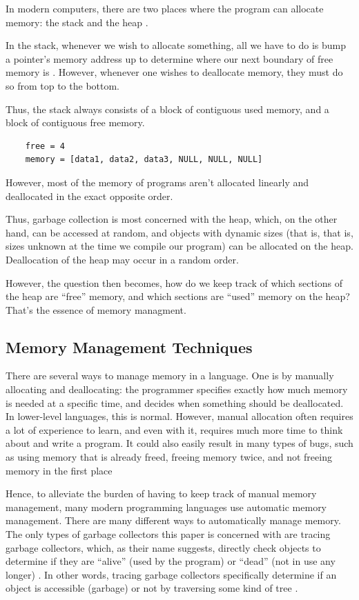 \documentclass[index]{subfiles}
\begin{document}
In modern computers, there are two places where the program can allocate memory: the stack and the heap .

In the stack, whenever we wish to allocate something, all we have to do is bump a pointer's memory address up to determine where our next boundary of free memory is \cite{the_rust_programming_language}. However, whenever one wishes to deallocate memory, they must do so from top to the bottom.

Thus, the stack always consists of a block of contiguous used memory, and a block of contiguous free memory.

\begin{verbatim}
    free = 4
    memory = [data1, data2, data3, NULL, NULL, NULL]
\end{verbatim}

However, most of the memory of programs aren't allocated linearly and deallocated in the exact opposite order.

Thus, garbage collection is most concerned with the heap, which, on the other hand, can be accessed at random, and objects with dynamic sizes (that is, that is, sizes unknown at the time we compile our program) can be allocated on the heap. Deallocation of the heap may occur in a random order.

However, the question then becomes, how do we keep track of which sections of the heap are ``free'' memory, and which sections are ``used'' memory on the heap? That's the essence of memory managment.

\subsection{Memory Management Techniques}

There are several ways to manage memory in a language. One is by manually allocating and deallocating: the programmer specifies exactly how much memory is needed at a specific time, and decides when something should be deallocated. In lower-level languages, this is normal. However, manual allocation often requires a lot of experience to learn, and even with it, requires much more time to think about and write a program. It could also easily result in many types of bugs, such as using memory that is already freed, freeing memory twice, and not freeing memory in the first place \cite[Chapter~1]{garbage_collection_overview_uw, gc_handbook}

Hence, to alleviate the burden of having to keep track of manual memory management, many modern programming languages use automatic memory management. There are many different ways to automatically manage memory. The only types of garbage collectors this paper is concerned with are tracing garbage collectors, which, as their name suggests, directly check objects to determine if they are ``alive'' (used by the program) or ``dead'' (not in use any longer) \cite{a_unified_theory_of_garbage_collection}. In other words, tracing garbage collectors specifically determine if an object is accessible (garbage) or not by traversing some kind of tree \cite[Chapter~1]{gc_handbook}.
\end{document}

